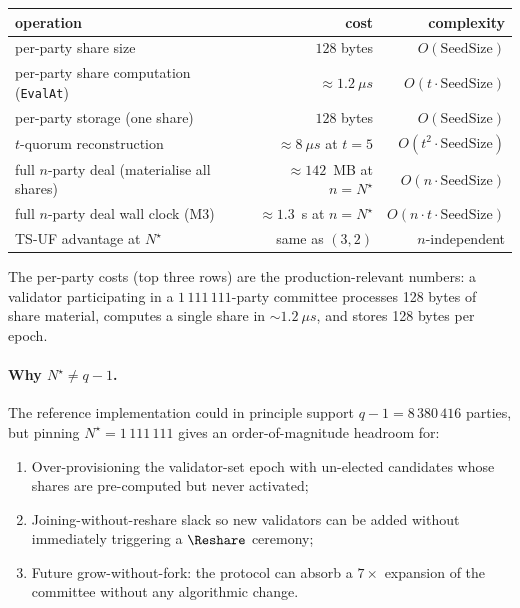 \begin{center}\small
\begin{tabular}{l r r}
\toprule
operation & cost & complexity \\
\midrule
per-party share size                 & $128$ bytes      & $O(\mathrm{SeedSize})$ \\
per-party share computation (\texttt{EvalAt}) & $\approx 1.2~\mu s$ & $O(t \cdot \mathrm{SeedSize})$ \\
per-party storage (one share)        & $128$ bytes      & $O(\mathrm{SeedSize})$ \\
$t$-quorum reconstruction            & $\approx 8~\mu s$ at $t = 5$ & $O(t^2 \cdot \mathrm{SeedSize})$ \\
full $n$-party deal (materialise all shares) & $\approx 142$~MB at $n = N^\star$ & $O(n \cdot \mathrm{SeedSize})$ \\
full $n$-party deal wall clock (M3)  & $\approx 1.3$~s at $n = N^\star$ & $O(n \cdot t \cdot \mathrm{SeedSize})$ \\
TS-UF advantage at $N^\star$         & same as $(3, 2)$ & $n$-independent \\
\bottomrule
\end{tabular}
\end{center}

The per-party costs (top three rows) are the production-relevant
numbers: a validator participating in a $1\,111\,111$-party committee
processes 128 bytes of share material, computes a single share in
$\sim 1.2~\mu s$, and stores 128 bytes per epoch.

\paragraph{Why $N^\star \neq q - 1$.}
The reference implementation could in principle support
$q - 1 = 8\,380\,416$ parties, but pinning $N^\star = 1\,111\,111$
gives an order-of-magnitude headroom for:

\begin{enumerate}[leftmargin=*, itemsep=0pt]
\item Over-provisioning the validator-set epoch with un-elected
candidates whose shares are pre-computed but never activated;
\item Joining-without-reshare slack so new validators can be added
without immediately triggering a $\Reshare$ ceremony;
\item Future grow-without-fork: the protocol can absorb a $7\times$
expansion of the committee without any algorithmic change.
\end{enumerate}


